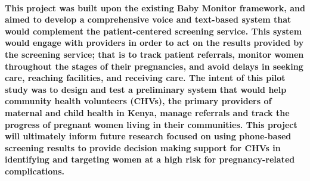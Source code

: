\paragraph{This project was built upon the existing Baby Monitor framework, and aimed to develop a comprehensive voice and text-based system that would complement the patient-centered screening service. This system would engage with providers in order to act on the results provided by the screening service; that is to track patient referrals, monitor women throughout the stages of their pregnancies, and avoid delays in seeking care, reaching facilities, and receiving care. The intent of this pilot study was to design and test a preliminary system that would help community health volunteers (CHVs), the primary providers of maternal and child health in Kenya, manage referrals and track the progress of pregnant women living in their communities. This project will ultimately inform future research focused on using phone-based screening results to provide decision making support for CHVs in identifying and targeting women at a high risk for pregnancy-related complications.}
